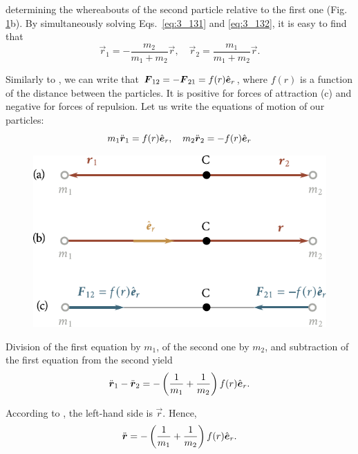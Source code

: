 \noindent
determining the whereabouts of the second particle relative to the first one (Fig. \ref{fig:3_30}b). By simultaneously solving Eqs.~\eqref{eq:3_131} and \eqref{eq:3_132}, it is easy to find that
\begin{equation}\label{eq:3_133}
\vec{r}_1 = -\frac{m_2}{m_1+m_2}\vec{r},\quad \vec{r}_2 = \frac{m_1}{m_1+m_2}\vec{r}.
\end{equation}

Similarly to , we can write that $\boldsymbol{F}_{12}=-\boldsymbol{F}_{21}=f(r)\hat{\boldsymbol{e}}_{r}$, where $f(r)$ is a function of the distance between the particles. It is positive for forces of attraction (c) and negative for forces of repulsion. Let us write the equations of motion of our particles:
\begin{equation*}
m_1\ddot{\boldsymbol{r}}_1 = f(r)\hat{\boldsymbol{e}}_{r},\quad m_2\ddot{\boldsymbol{r}}_2 = -f(r)\hat{\boldsymbol{e}}_{r}
\end{equation*}

\begin{figure}[t]
	\begin{center}
		\includegraphics[scale=1]{figures/ch_03/fig_3_30.pdf}
		\caption[]{}
		\label{fig:3_30}
	\end{center}
\vspace{-0.7cm}
\end{figure}

\noindent
Division of the first equation by $m_1$, of the second one by $m_2$, and subtraction of the first equation from the second yield
\begin{equation*}
\ddot{\boldsymbol{r}}_1 - \ddot{\boldsymbol{r}}_2 = -\left(\frac{1}{m_1}+\frac{1}{m_2}\right)f(r)\hat{\boldsymbol{e}}_{r}.
\end{equation*}

\noindent
According to , the left-hand side is $\vec{r}$. Hence,
\begin{equation}\label{eq:3_134}
\ddot{\boldsymbol{r}} = -\left(\frac{1}{m_1}+\frac{1}{m_2}\right)f(r)\hat{\boldsymbol{e}}_{r}.
\end{equation}

